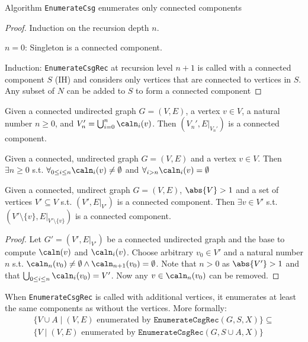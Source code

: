 \documentclass[11pt]{article}
\begin{document}
\begin{lemma}[]
\label{2}
Algorithm \texttt{EnumerateCsg} enumerates only connected components
\end{lemma}

\begin{proof}
Induction on the recursion depth \(n\).

\(n=0\): Singleton is a connected component.

Induction: \texttt{EnumerateCsgRec} at recursion level \(n+1\) is called with a connected component \(S\) (IH)
and considers only vertices that are connected to vertices in \(S\). Any subset of \(N\) can be added
to \(S\) to form a connected component
\end{proof}

\begin{lemma}[]
\label{5}
Given a connected undirected graph \(G=(V,E)\), a vertex \(v\in V\), a natural number \(n\ge 0\), and
\(V_n'=\bigcup_{i=0}^n\caln_i(v)\). Then \((V_n',E|_{V_n'})\) is a connected component.
\end{lemma}

\begin{lemma}[]
Given a connected, undirected graph \(G=(V,E)\) and a vertex \(v\in V\). Then \(\exists n\ge 0\) s.t.
\(\forall_{0\le i\le n}\caln_i(v)\neq\emptyset\) and \(\forall_{i>n}\caln_i(v)=\emptyset\)
\end{lemma}

\begin{lemma}[]
Given a connected, undirect graph \(G=(V,E)\), \(\abs{V}>1\) and a set of vertices \(V'\subseteq V\)
s.t. \((V',E|_{V'})\) is a connected component. Then \(\exists v\in V'\) s.t.
\((V'\setminus\{v\},E|_{V'\setminus\{v\}})\) is a connected component.
\end{lemma}

\begin{proof}
Let \(G'=(V',E|_{V'})\) be a connected undirected graph and the base to compute \(\caln(v)\) and
\(\caln_i(v)\). Choose arbitrary \(v_0\in V'\) and a natural number \(n\) s.t.
\(\caln_n(v_0)\neq\emptyset\wedge\caln_{n+1}(v_0)=\emptyset\). Note that \(n>0\) as \(\abs{V'}>1\) and
that \(\bigcup_{0\le i\le n}\caln_i(v_0)=V'\). Now any \(v\in\caln_n(v_0)\) can be removed.
\end{proof}

\begin{lemma}[]
When \texttt{EnumerateCsgRec} is called with additional vertices, it enumerates at least the same components as
without the vertices. More formally:
\begin{gather*}
\{V\cup A\mid(V,E)\text{ enumerated by }\texttt{EnumerateCsgRec}(G,S,X)\}\subseteq\\
\{V\mid(V,E)\text{ enumerated by }\texttt{EnumerateCsgRec}(G,S\cup A,X)\}
\end{gather*}
\end{lemma}
\end{document}
